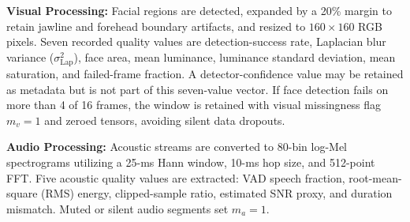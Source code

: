 \documentclass[conference]{IEEEtran}
\begin{document}
\textbf{Visual Processing:} Facial regions are detected, expanded by a 20\% margin to retain jawline and forehead boundary artifacts, and resized to $160 \times 160$ RGB pixels. Seven recorded quality values are detection-success rate, Laplacian blur variance ($\sigma_{\mathrm{Lap}}^2$), face area, mean luminance, luminance standard deviation, mean saturation, and failed-frame fraction. A detector-confidence value may be retained as metadata but is not part of this seven-value vector. If face detection fails on more than 4 of 16 frames, the window is retained with visual missingness flag $m_v = 1$ and zeroed tensors, avoiding silent data dropouts.

\textbf{Audio Processing:} Acoustic streams are converted to 80-bin log-Mel spectrograms utilizing a 25-ms Hann window, 10-ms hop size, and 512-point FFT. Five acoustic quality values are extracted: VAD speech fraction, root-mean-square (RMS) energy, clipped-sample ratio, estimated SNR proxy, and duration mismatch. Muted or silent audio segments set $m_a = 1$.
\end{document}
